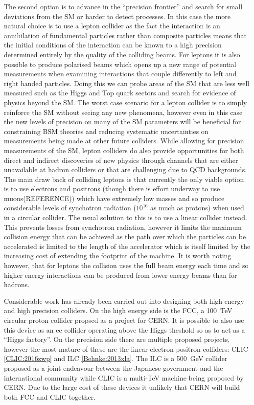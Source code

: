 The second option is to advance in the ``precision frontier'' and search for small deviations from the \ac{SM} or harder to detect processes. In this case the more natural choice is to use a lepton collider as the fact the interaction is an annihilation of fundamental particles rather than composite particles means that the initial conditions of the interaction can be known to a high precision determined entirely by the quality of the colliding beams. For leptons it is also possible to produce polarised beams which opens up a new range of potential measurements when examining interactions that couple differently to left and right handed particles. Doing this we can probe areas of the \ac{SM} that are less well measured such as the Higgs and Top quark sectors and search for evidence of physics beyond the \ac{SM}. The worst case scenario for a lepton collider is to simply reinforce the \ac{SM} without seeing any new phenomena, however even in this case the new levels of precision on many of the \ac{SM} parameters will be beneficial for constraining \ac{BSM} theories and reducing systematic uncertainties on measurements being made at other future colliders. While allowing for precision measurements of the \ac{SM}, lepton colliders do also provide opportunities for both direct and indirect discoveries of new physics through channels that are either unavailable at hadron colliders or that are challenging due to \ac{QCD} backgrounds. The main draw back of colliding leptons is that currently the only viable option is to use electrons and positrons (though there is effort underway to use muons(REFERENCE)) which have extremely low masses and so produce considerable levels of synchotron radiation (${10^{16}}$ as much as protons) when used in a circular collider. The usual solution to this is to use a linear collider instead. This prevents losses from synchotron radiation, however it limits the maximum collision energy that can be achieved as the path over which the particles can be accelerated is limited to the length of the accelerator which is itself limited by the increasing cost of extending the footprint of the machine. It is worth noting however, that for leptons the collision uses the full beam energy each time and so higher energy interactions can be produced from lower energy beams than for hadrons.

Considerable work has already been carried out into designing both high energy and high precision colliders. On the high energy side is the \ac{FCC}, a 100~TeV circular proton collider propsed as a project for \ac{CERN}. It is possible to also use this device as an ee collider operating above the Higgs theshold so as to act as a ``Higgs factory''. On the precision side there are multiple proposed projects, however the most mature of these are the linear electron-positron colliders: \ac{CLIC} \ref{CLIC:2016zwp} and \ac{ILC} \ref{Behnke:2013xla}. The \ac{ILC} is a 500~GeV collider proposed as a joint endeavour between the Japanese government and the international community while \ac{CLIC} is a multi-TeV machine being proposed by \ac{CERN}. Due to the large cost of these devices it unlikely that \ac{CERN} will build both \ac{FCC} and \ac{CLIC} together.

